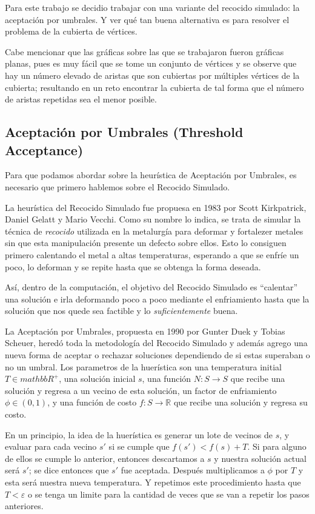 \documentclass{article}
\newcommand{\tit}[1]{\textit{#1}}
\begin{document}
  Para este trabajo se decidio trabajar con una variante del 
  recocido simulado: la aceptación por umbrales. Y ver qué tan
  buena alternativa es para resolver el problema de la cubierta
  de vértices. 

  Cabe mencionar que las gráficas sobre las que se trabajaron fueron 
  gráficas planas, pues es muy fácil que se tome un conjunto de vértices
  y se observe que hay un número elevado de aristas que son cubiertas por 
  múltiples vértices de la cubierta; resultando en un reto encontrar 
  la cubierta de tal forma que el número de aristas repetidas sea el 
  menor posible.

  \subsection{Aceptación por Umbrales (Threshold Acceptance)}
  Para que podamos abordar sobre la heurística de Aceptación por Umbrales,
  es necesario que primero hablemos sobre el Recocido Simulado.

  La heurística del Recocido Simulado fue propuesa en 1983 por
  Scott Kirkpatrick, Daniel Gelatt y Mario Vecchi. Como su nombre
  lo indica, se trata de simular la técnica de \tit{recocido}
  utilizada en la metalurgía para deformar y fortalezer metales sin 
  que esta manipulación presente un defecto sobre ellos. Esto lo 
  consiguen primero calentando el metal a altas temperaturas,
  esperando a que se enfríe un poco, lo deforman y se repite hasta
  que se obtenga la forma deseada.

  Así, dentro de la computación, el objetivo del Recocido Simulado
  es ``calentar'' una solución e irla deformando poco a poco 
  mediante el enfriamiento hasta que la solución que nos quede 
  sea factible y lo \tit{suficientemente} buena.

  La Aceptación por Umbrales, propuesta en 1990 por Gunter Duek y
  Tobias Scheuer, heredó toda la metodología del Recocido
  Simulado y además agrego una nueva forma de aceptar o rechazar
  soluciones dependiendo de si estas superaban o no un umbral.
  Los parametros de la huerística son una temperatura initial 
  $T \in mathbb{R}^+$, una solución inicial $s$, una función 
  $N: S \rightarrow S$ que recibe una solución y regresa a un vecino 
  de esta solución,  un factor de enfriamiento $\phi \in (0, 1)$, y 
  una función de costo $f: S \rightarrow \mathbb{R}$ que recibe 
  una solución y regresa su costo.

  En un principio, la idea de la huerística es generar un lote 
  de vecinos de $s$, y evaluar para cada vecino $s'$ si se 
  cumple que $f(s') < f(s) + T$. Si para alguno de ellos se cumple
  lo anterior, entonces descartamos a $s$ y nuestra solución actual 
  será $s'$; se dice entonces que $s'$ fue aceptada. Después
  multiplicamos a $\phi$ por $T$ y esta será nuestra nueva 
  temperatura. Y repetimos este procedimiento hasta que 
  $T < \varepsilon$ o se tenga un limite para la cantidad de veces 
  que se van a repetir los pasos anteriores.
\end{document}
